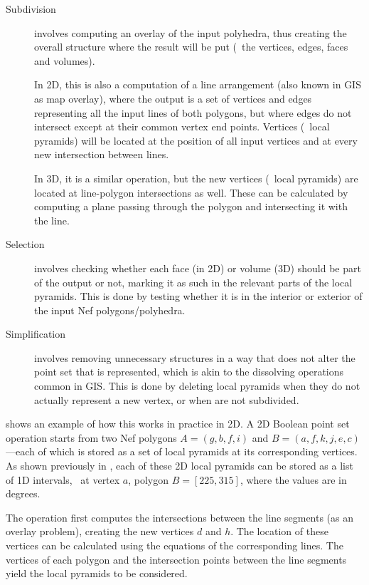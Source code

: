 \begin{description}

\item[Subdivision] involves computing an overlay of the input polyhedra, thus creating the overall structure where the result will be put (\ie\ the vertices, edges, faces and volumes).

In 2D, this is also a computation of a line arrangement (also known in GIS as map overlay), where the output is a set of vertices and edges representing all the input lines of both polygons, but where edges do not intersect except at their common vertex end points.
Vertices (\ie\ local pyramids) will be located at the position of all input vertices and at every new intersection between lines.

In 3D, it is a similar operation, but the new vertices (\ie\ local pyramids) are located at line-polygon intersections as well.
These can be calculated by computing a plane passing through the polygon and intersecting it with the line.

\item[Selection] involves checking whether each face (in 2D) or volume (3D) should be part of the output or not, marking it as such in the relevant parts of the local pyramids.
This is done by testing whether it is in the interior or exterior of the input Nef polygons/polyhedra.

\item[Simplification] involves removing unnecessary structures in a way that does not alter the point set that is represented, which is akin to the dissolving operations common in GIS\@.
This is done by deleting local pyramids when they do not actually represent a new vertex, or when are not subdivided.

\end{description}

 shows an example of how this works in practice in 2D.
A 2D Boolean point set operation starts from two Nef polygons \(A = (g, b, f, i)\) and \(B = (a, f, k, j, e, c)\)---each of which is stored as a set of local pyramids at its corresponding vertices.
As shown previously in , each of these 2D local pyramids can be stored as a list of 1D intervals, \eg\ at vertex \(a\), polygon \(B = [225, 315]\), where the values are in degrees.

The operation first computes the intersections between the line segments (as an overlay problem), creating the new vertices \(d\) and \(h\).
The location of these vertices can be calculated using the equations of the corresponding lines.
The vertices of each polygon and the intersection points between the line segments yield the local pyramids to be considered.

